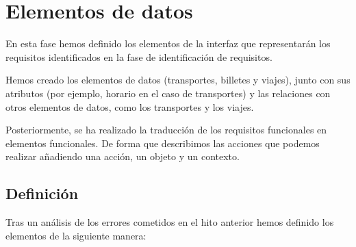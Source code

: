 \section{Elementos de datos}

En esta fase hemos definido los elementos de la interfaz que representarán los
requisitos identificados en la fase de identificación de requisitos.

Hemos creado los elementos de datos (transportes, billetes y viajes), junto con sus
atributos (por ejemplo, horario en el caso de transportes) y las relaciones con otros
elementos de datos, como los transportes y los viajes.

Posteriormente, se ha realizado la traducción de los requisitos funcionales en elementos
funcionales. De forma que describimos las acciones que podemos realizar añadiendo una acción,
un objeto y un contexto.

\subsection{Definición}

Tras un análisis de los errores cometidos en el hito anterior hemos definido los elementos
de la siguiente manera:

